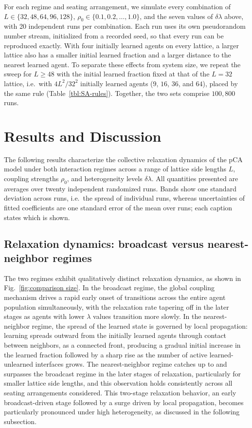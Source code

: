 \documentclass[a4paper,fleqn]{cas-sc}
\begin{document}
For each regime and seating arrangement, we simulate every combination of $L\in\{32,48,64,96,128\}$, $\rho_0\in\{0.1,0.2,\dots,1.0\}$, and the seven values of $\delta\lambda$ above, with 20 independent runs per combination.
Each run uses its own pseudorandom number stream, initialized from a recorded seed, so that every run can be reproduced exactly.
With four initially learned agents on every lattice, a larger lattice also has a smaller initial learned fraction and a larger distance to the nearest learned agent.
To separate these effects from system size, we repeat the sweep for $L\geq48$ with the initial learned fraction fixed at that of the $L=32$ lattice, i.e.\ with $4L^2/32^2$ initially learned agents ($9$, $16$, $36$, and $64$), placed by the same rule (Table~\ref{tbl:SA-rules}).
Together, the two sets comprise $100{,}800$ runs.

\section{Results and Discussion}\label{sec:rnd}

The following results characterize the collective relaxation dynamics of the pCA model under both interaction regimes across a range of lattice side lengths $L$, coupling strengths $\rho_0$, and heterogeneity levels $\delta\lambda$.
All quantities presented are averages over twenty independent randomized runs. Bands show one standard deviation across runs, i.e.\ the spread of individual runs, whereas uncertainties of fitted coefficients are one standard error of the mean over runs; each caption states which is shown.

\subsection{Relaxation dynamics: broadcast versus nearest-neighbor regimes}

  The two regimes exhibit qualitatively distinct relaxation dynamics, as shown in Fig.~\ref{fig:comparison size}.
  In the broadcast regime, the global coupling mechanism drives a rapid early onset of transitions across the entire agent population simultaneously, with the relaxation rate tapering off in the later stages as agents with lower $\lambda$ values transition more slowly.
  In the nearest-neighbor regime, the spread of the learned state is governed by local propagation: learning spreads outward from the initially learned agents through contact between neighbors, as a connected front, producing a gradual initial increase in the learned fraction followed by a sharp rise as the number of active learned-unlearned interfaces grows.
  The nearest-neighbor regime catches up to and surpasses the broadcast regime in the later stages of relaxation, particularly for smaller lattice side lengths, and this observation holds consistently across all seating arrangements considered.
  This two-stage relaxation behavior, an early broadcast-driven stage followed by a surge driven by local propagation, becomes particularly pronounced under high heterogeneity, as discussed in the following subsection.
\end{document}
